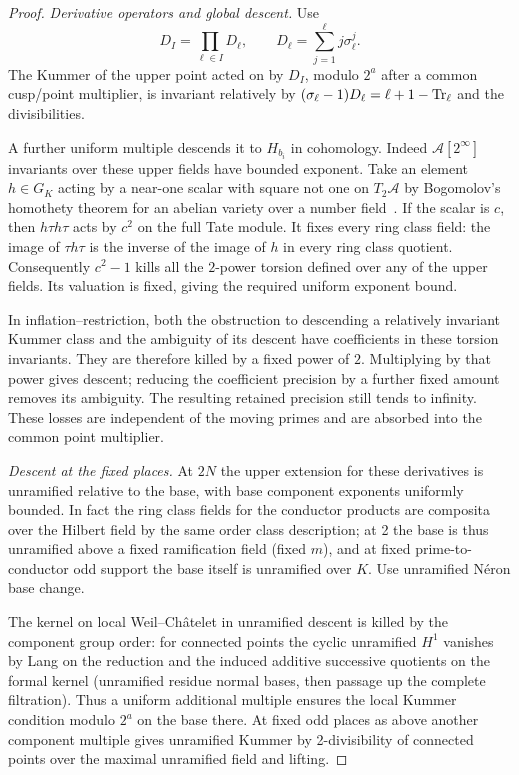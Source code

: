 \begin{proof}
\smallskip\noindent\emph{Derivative operators and global descent.}
Use
\[
             D_I=\prod_{\ell\in I}D_\ell,\qquad
             D_\ell=\sum_{j=1}^{\ell} j\sigma_\ell^j .
\]
The Kummer of the upper point acted on by \(D_I\), modulo \(2^a\) after a common cusp/point multiplier, is invariant relatively by \((\sigma_\ell-1)D_\ell=\ell+1-{\rm Tr}_\ell\) and the divisibilities.

A further uniform multiple descends it to \(H_{b_i}\) in cohomology. Indeed \(\mathcal A[2^\infty]\) invariants over these upper fields have bounded exponent. Take an element \(h\in G_K\) acting by a near-one scalar with square not one on \(T_2\mathcal A\) by Bogomolov's homothety theorem for an abelian variety over a number field~\cite{Bogomolov80}. If the scalar is \(c\), then \(h\tau h\tau\) acts by \(c^2\) on the full Tate module. It fixes every ring class field: the image of \(\tau h\tau\) is the inverse of the image of \(h\) in every ring class quotient. Consequently \(c^2-1\) kills all the \(2\)-power torsion defined over any of the upper fields. Its valuation is fixed, giving the required uniform exponent bound.

In inflation--restriction, both the obstruction to descending a relatively invariant Kummer class and the ambiguity of its descent have coefficients in these torsion invariants. They are therefore killed by a fixed power of \(2\). Multiplying by that power gives descent; reducing the coefficient precision by a further fixed amount removes its ambiguity. The resulting retained precision still tends to infinity. These losses are independent of the moving primes and are absorbed into the common point multiplier.

\smallskip\noindent\emph{Descent at the fixed places.}
At \(2N\) the upper extension for these derivatives is unramified relative to the base, with base component exponents uniformly bounded. In fact the ring class fields for the conductor products are composita over the Hilbert field by the same order class description; at 2 the base is thus unramified above a fixed ramification field (fixed \(m\)), and at fixed prime-to-conductor odd support the base itself is unramified over \(K\). Use unramified Néron base change.

The kernel on local Weil--Châtelet in unramified descent is killed by the component group order: for connected points the cyclic unramified \(H^1\) vanishes by Lang on the reduction and the induced additive successive quotients on the formal kernel (unramified residue normal bases, then passage up the complete filtration). Thus a uniform additional multiple ensures the local Kummer condition modulo \(2^a\) on the base there. At fixed odd places as above another component multiple gives unramified Kummer by 2-divisibility of connected points over the maximal unramified field and lifting.


\end{proof}
